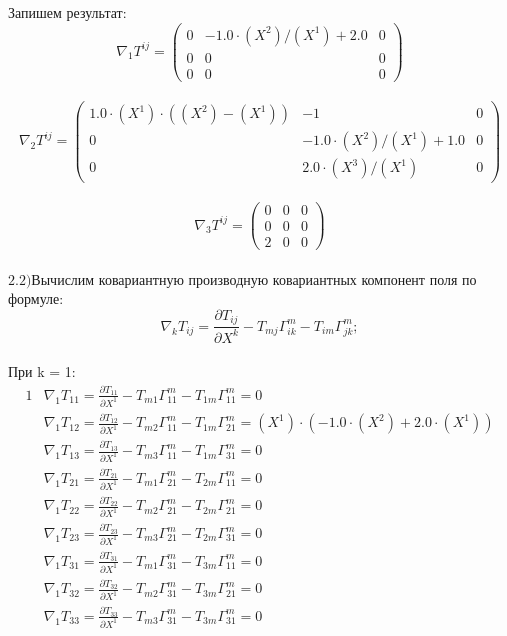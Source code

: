\documentclass{article}
\begin{document}
Запишем результат:\\
\[
\nabla_1T^{ij} = \begin{pmatrix}
	0 & -1.0\cdot (X^2)/(X^1) + 2.0 & 0\\
	0 & 0 & 0\\
	0 & 0 & 0
\end{pmatrix}
\]\\
\[
\nabla_2T^{ij} = \begin{pmatrix}
	1.0\cdot (X^1)\cdot ((X^2) - (X^1)) & -1 & 0\\
	0 & -1.0\cdot (X^2)/(X^1) + 1.0 & 0\\
	0 & 2.0\cdot (X^3)/(X^1) & 0
\end{pmatrix}
\]\\
\[
\nabla_3T^{ij} = \begin{pmatrix}
	0 & 0 & 0\\
	0 & 0 & 0\\
	2 & 0 & 0
\end{pmatrix}
\]\\
$\mathrm{2.2) }$Вычислим ковариантную производную ковариантных компонент поля по формуле:\\
\[
\nabla_kT_{ij} = \frac{\partial T_{ij}}{\partial X^k} - T_{mj}\Gamma^m_{ik} - T_{im}\Gamma^m_{jk};
\]\\
При k = 1:\\
\begin{alignat*}{1}
  & \nabla_1T_{11} = \frac{\partial T_{11}}{\partial X^1} - T_{m1}\Gamma^m_{11} - T_{1m}\Gamma^m_{11} = 0 \\
  & \nabla_1T_{12} = \frac{\partial T_{12}}{\partial X^1} - T_{m2}\Gamma^m_{11} - T_{1m}\Gamma^m_{21} = (X^1)\cdot (-1.0\cdot (X^2) + 2.0\cdot (X^1)) \\
  & \nabla_1T_{13} = \frac{\partial T_{13}}{\partial X^1} - T_{m3}\Gamma^m_{11} - T_{1m}\Gamma^m_{31} = 0 \\
  & \nabla_1T_{21} = \frac{\partial T_{21}}{\partial X^1} - T_{m1}\Gamma^m_{21} - T_{2m}\Gamma^m_{11} = 0 \\
  & \nabla_1T_{22} = \frac{\partial T_{22}}{\partial X^1} - T_{m2}\Gamma^m_{21} - T_{2m}\Gamma^m_{21} = 0 \\
  & \nabla_1T_{23} = \frac{\partial T_{23}}{\partial X^1} - T_{m3}\Gamma^m_{21} - T_{2m}\Gamma^m_{31} = 0 \\
  & \nabla_1T_{31} = \frac{\partial T_{31}}{\partial X^1} - T_{m1}\Gamma^m_{31} - T_{3m}\Gamma^m_{11} = 0 \\
  & \nabla_1T_{32} = \frac{\partial T_{32}}{\partial X^1} - T_{m2}\Gamma^m_{31} - T_{3m}\Gamma^m_{21} = 0 \\
  & \nabla_1T_{33} = \frac{\partial T_{33}}{\partial X^1} - T_{m3}\Gamma^m_{31} - T_{3m}\Gamma^m_{31} = 0 
\end{alignat*}\\
\end{document}
